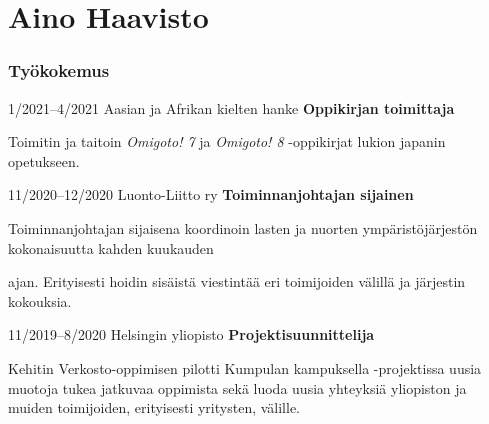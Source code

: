 \documentclass{tccv_fin}
\begin{document}
\BgThispage

\part{Aino Haavisto}

\section{Työkokemus}

\begin{eventlist}

\item{1/2021--4/2021}
    {Aasian ja Afrikan kielten hanke}
    {\textbf{Oppikirjan toimittaja}}
    
Toimitin ja taitoin \textit{Omigoto! 7} ja \textit{Omigoto! 8} -oppikirjat lukion japanin opetukseen.

    

\item{11/2020--12/2020}
     {Luonto-Liitto ry}
     {\textbf{Toiminnanjohtajan sijainen}}

Toiminnanjohtajan sijaisena koordinoin lasten ja nuorten ympäristöjärjestön kokonaisuutta kahden kuukauden 

ajan. Erityisesti hoidin sisäistä viestintää eri toimijoiden välillä ja järjestin kokouksia.

\item{11/2019--8/2020}
	 {Helsingin yliopisto}
	 {\textbf{Projektisuunnittelija}}
	 
Kehitin Verkosto-oppimisen pilotti Kumpulan kampuk\-sel\-la -projektissa uusia muotoja tukea jatkuvaa oppimista sekä luoda uusia yhteyksiä yliopiston ja muiden toi\-mi\-joi\-den, erityisesti yritysten, välille.

	 

	 

\end{eventlist}
\end{document}
